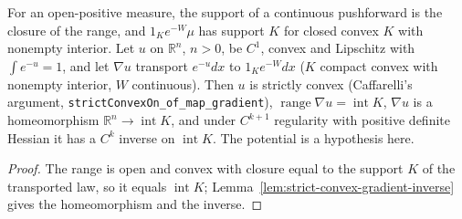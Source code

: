 \begin{lemma}
  \label{lem:transport-gradient-range}
  \leanok
  For an open-positive measure, the support of a continuous pushforward is the closure of the range, and $1_Ke^{-W}\mu$ has
  support $K$ for closed convex $K$ with nonempty interior. Let $u$ on $\mathbb R^n$, $n>0$, be $C^1$, convex and Lipschitz with
  $\int e^{-u}=1$, and let $\nabla u$ transport $e^{-u}dx$ to $1_Ke^{-W}dx$ ($K$ compact convex with nonempty interior, $W$
  continuous). Then $u$ is strictly convex (Caffarelli's argument, \texttt{strictConvexOn\_of\_map\_gradient}),
  $\operatorname{range}\nabla u=\operatorname{int}K$, $\nabla u$ is a homeomorphism $\mathbb R^n\to\operatorname{int}K$, and
  under $C^{k+1}$ regularity with positive definite Hessian it has a $C^k$ inverse on $\operatorname{int}K$. The potential is
  a hypothesis here.
\end{lemma}
\begin{proof}
  \leanok
  The range is open and convex with closure equal to the support $K$ of the transported law, so it equals
  $\operatorname{int}K$; Lemma~\ref{lem:strict-convex-gradient-inverse} gives the homeomorphism and the inverse.
\end{proof}

